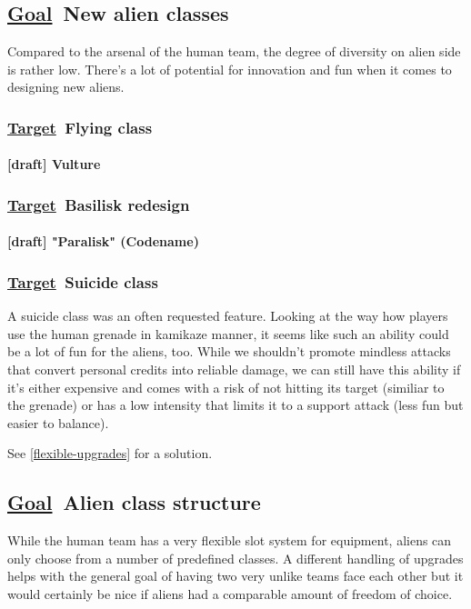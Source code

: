 \documentclass{scrartcl}
\newcommand{\goal}     [0]{\textbf{\underline{Goal}\ }}
\newcommand{\target}   [0]{\textbf{\underline{Target}\ }}
\newcommand{\draft}    [0]{\textcolor{draft}    {\textbf{[draft] }}}
\begin{document}
\subsection{\goal New alien classes}

Compared to the arsenal of the human team, the degree of diversity on alien side is rather low. There's a lot of potential for innovation and fun when it comes to designing new aliens.

\subsubsection{\target Flying class}

\paragraph{\draft Vulture}
\label{vulture}

\subsubsection{\target Basilisk redesign}

\paragraph{\draft "Paralisk" (Codename)}
\label{paralisk}

\subsubsection{\target Suicide class}
\label{suicide-class}

A suicide class was an often requested feature. Looking at the way how players use the human grenade in kamikaze manner, it seems like such an ability could be a lot of fun for the aliens, too. While we shouldn't promote mindless attacks that convert personal credits into reliable damage, we can still have this ability if it's either expensive and comes with a risk of not hitting its target (similiar to the grenade) or has a low intensity that limits it to a support attack (less fun but easier to balance).

See \ref{flexible-upgrades} for a solution.

\subsection{\goal Alien class structure}

While the human team has a very flexible slot system for equipment, aliens can only choose from a number of predefined classes. A different handling of upgrades helps with the general goal of having two very unlike teams face each other but it would certainly be nice if aliens had a comparable amount of freedom of choice.
\end{document}
